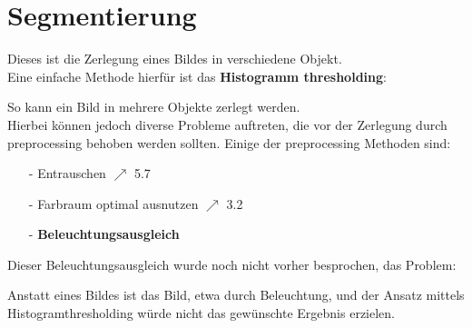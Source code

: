     \section{Segmentierung}

Dieses ist die Zerlegung eines Bildes in verschiedene Objekt.\\
Eine einfache Methode hierfür ist das \textbf{Histogramm thresholding}:
\begin{center}
\end{center}
So kann ein Bild in mehrere Objekte zerlegt werden.\\
Hierbei können jedoch diverse Probleme auftreten, die vor der Zerlegung durch preprocessing behoben werden sollten. Einige der preprocessing Methoden sind:
\begin{enumerate}
  \item[-] Entrauschen $\nearrow$ 5.7
  \item[-] Farbraum optimal ausnutzen $\nearrow$ 3.2
  \item[-] \textbf{Beleuchtungsausgleich}
\end{enumerate}
Dieser Beleuchtungsausgleich wurde noch nicht vorher besprochen, das Problem:

\begin{center}
\end{center}

Anstatt eines  Bildes ist das Bild, etwa durch Beleuchtung,  und der Ansatz mittels Histogramthresholding würde nicht das gewünschte Ergebnis erzielen.\\

